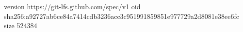 version https://git-lfs.github.com/spec/v1
oid sha256:a92727ab6ce84a7414cdb3236acc3c951991859851e977729a2d8081e38ee6fc
size 524384
